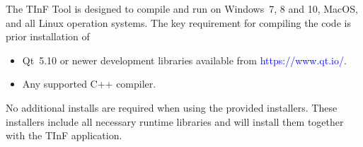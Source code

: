 The TInF Tool is designed to compile and run on Windows~7, 8 and 10, MacOS, and all Linux operation systems.  
The key requirement for compiling the code is prior installation of 
\begin{itemize}
\item Qt~5.10 or newer development libraries available from
     \textcolor{blue}{https://www.qt.io/}.
\item Any supported C++ compiler.
\end{itemize}

\noindent
No additional installs are required when using the provided installers.  These installers include all necessary runtime libraries and will install them together with the TInF application.
